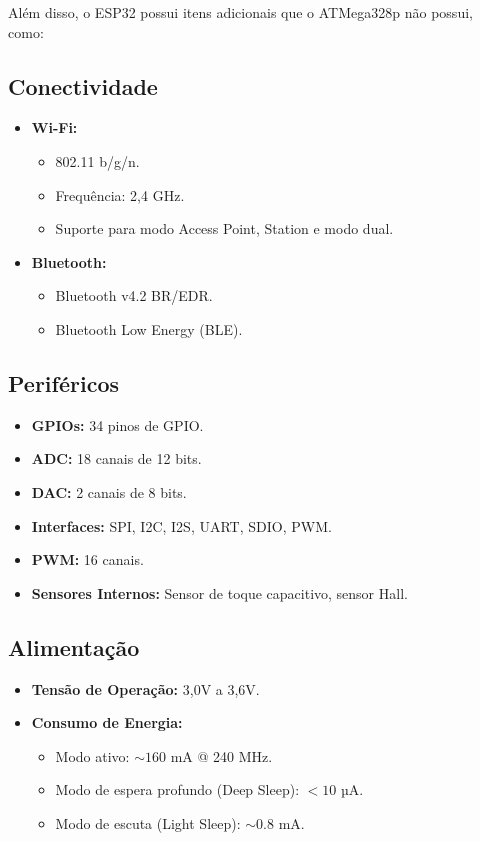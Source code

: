 Além disso, o ESP32 possui itens adicionais que o ATMega328p não possui, como:

\subsection{Conectividade}
\begin{itemize}
    \item \textbf{Wi-Fi:} 
    \begin{itemize}
        \item 802.11 b/g/n.
        \item Frequência: 2,4 GHz.
        \item Suporte para modo Access Point, Station e modo dual.
    \end{itemize}
    \item \textbf{Bluetooth:}
    \begin{itemize}
        \item Bluetooth v4.2 BR/EDR.
        \item Bluetooth Low Energy (BLE).
    \end{itemize}
\end{itemize}

\subsection{Periféricos}
\begin{itemize}
    \item \textbf{GPIOs:} 34 pinos de GPIO.
    \item \textbf{ADC:} 18 canais de 12 bits.
    \item \textbf{DAC:} 2 canais de 8 bits.
    \item \textbf{Interfaces:} SPI, I2C, I2S, UART, SDIO, PWM.
    \item \textbf{PWM:} 16 canais.
    \item \textbf{Sensores Internos:} Sensor de toque capacitivo, sensor Hall.
\end{itemize}

\subsection{Alimentação}
\begin{itemize}
    \item \textbf{Tensão de Operação:} 3,0V a 3,6V.
    \item \textbf{Consumo de Energia:}
    \begin{itemize}
        \item Modo ativo: $\sim160$ mA @ 240 MHz.
        \item Modo de espera profundo (Deep Sleep): $<10$ µA.
        \item Modo de escuta (Light Sleep): $\sim0.8$ mA.
    \end{itemize}
\end{itemize}

